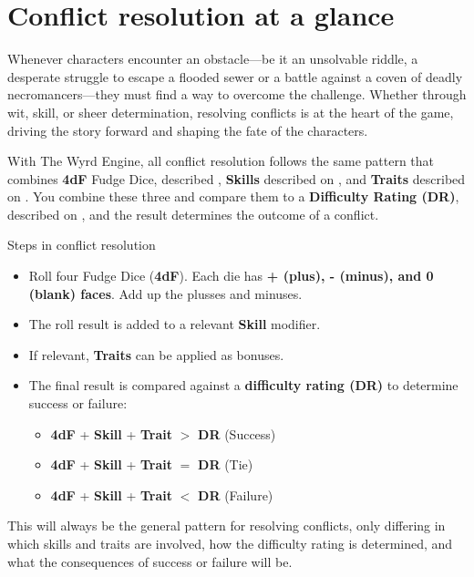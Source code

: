 \section{Conflict resolution at a glance}

Whenever characters encounter an obstacle—be it an unsolvable riddle, a desperate struggle to escape a flooded sewer or a battle against a coven of deadly necromancers—they must find a way to overcome the challenge. Whether through wit, skill, or sheer determination, resolving conflicts is at the heart of the game, driving the story forward and shaping the fate of the characters.

With The Wyrd Engine, all conflict resolution follows the same pattern that combines \textbf{4dF} Fudge Dice, described , \textbf{Skills} described on , and \textbf{Traits} described on . You combine these three and compare them to a \textbf{Difficulty Rating (DR)}, described on , and the result determines the outcome of a conflict.

\begin{DndReadAloud}{Steps in conflict resolution}
	\begin{itemize}
		\item Roll four Fudge Dice (\textbf{4dF}).
		      Each die has \textbf{+ (plus), - (minus), and 0 (blank) faces}. Add up the plusses and minuses.
		\item The roll result is added to a relevant \textbf{Skill} modifier.
		\item If relevant, \textbf{Traits} can be applied as bonuses.
		\item The final result is compared against a \textbf{difficulty rating (DR)} to determine success or failure:
		\begin{itemize}
			\item \textbf{4dF} + \textbf{Skill} + \textbf{Trait} $>$ \textbf{DR} (Success)	
			\item \textbf{4dF} + \textbf{Skill} + \textbf{Trait} $=$ \textbf{DR} (Tie)
			\item \textbf{4dF} + \textbf{Skill} + \textbf{Trait} $<$ \textbf{DR} (Failure)
		\end{itemize}
	\end{itemize}
\end{DndReadAloud}

This will always be the general pattern for resolving conflicts, only differing in which skills and traits are involved, how the difficulty rating is determined, and what the consequences of success or failure will be.

